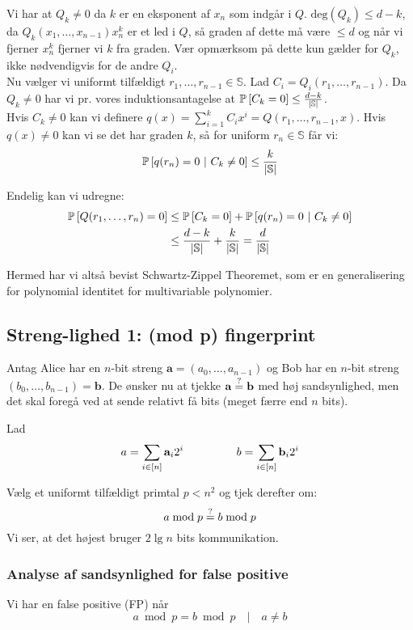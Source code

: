 Vi har at $Q_k \neq 0$ da $k$ er en eksponent af $x_n$ som indgår i $Q$. $\text{deg}(Q_k) \leq d - k$, da $Q_k (x_1, \dots, x_{n-1})x_n^k$ er et led i $Q$, så graden af dette må være $\leq d$ og når vi fjerner $x_n^k$ fjerner vi $k$ fra graden. Vær opmærksom på dette kun gælder for $Q_k$, ikke nødvendigvis for de andre $Q_i$.\\


Nu vælger vi uniformt tilfældigt $r_1, \dots, r_{n-1} \in \mathbb S$. Lad $C_i = Q_i(r_1, \dots, r_{n-1})$. Da $Q_k \neq 0$ har vi pr. vores induktionsantagelse at $\P{C_k = 0} \leq \frac{d - k}{|\mathbb S|}$.\\

Hvis $C_k \neq 0$ kan vi definere $q(x) = \sum_{i=1}^k C_i x^i = Q(r_1, \dots, r_{n-1}, x)$. Hvis $q(x) \neq 0$ kan vi se det har graden $k$, så for uniform $r_n \in \mathbb S$ får vi:
$$
\P{q(r_n) = 0 \ | C_k \neq 0} \leq \frac{k}{|\mathbb S|}
$$

Endelig kan vi udregne:
\begin{align}
  \P{Q(r_1, \dots, r_n) = 0}
  &\leq \P{C_k = 0} + \P{q(r_n) = 0 | C_k \neq 0}\\
  &\leq \frac{d - k}{|\mathbb S|} + \frac{k}{|\mathbb S|} = \frac{d}{|\mathbb S|}
\end{align}

Hermed har vi altså bevist Schwartz-Zippel Theoremet, som er en generalisering for polynomial identitet for multivariable polynomier.


\subsection{Streng-lighed 1: (mod p) fingerprint}
Antag Alice har en $n$-bit streng $\mathbf a = (a_0, \dots, a_{n-1})$ og Bob har en $n$-bit streng $(b_0, \dots, b_{n-1}) = \mathbf b$. De ønsker nu at tjekke $\mathbf a \? \mathbf b$ med høj sandsynlighed, men det skal foregå ved at sende relativt få bits (meget færre end $n$ bits).

Lad
$$
  a = \sum_{i \in [n]} \mathbf a_i 2^i
  \longspace
  b = \sum_{i \in [n]} \mathbf b_i 2^i
$$

Vælg et uniformt tilfældigt primtal $p < n^2$ og tjek derefter om:
$$
  a \bmod p \? b \bmod p
$$
Vi ser, at det højest bruger $2 \lg n$ bits kommunikation.



\subsubsection{Analyse af sandsynlighed for false positive}
Vi har en false positive (FP) når
$$
  a \bmod p = b \bmod p \quad | \quad a \neq b
$$

